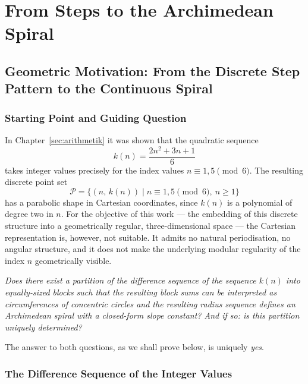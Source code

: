 \chapter{From Steps to the Archimedean Spiral}\label{sec:spirale}

\section{Geometric Motivation: From the Discrete Step Pattern to the
Continuous Spiral}

\subsection{Starting Point and Guiding Question}

In Chapter~\ref{sec:arithmetik} it was shown that the quadratic sequence
\[
  k(n) = \frac{2n^2 + 3n + 1}{6}
\]
takes integer values precisely for the index values $n \equiv 1, 5 \pmod{6}$.
The resulting discrete point set
\[
  \mathcal{P} = \bigl\{(n,\, k(n)) \mid n \equiv 1, 5 \pmod{6},\ n \geq 1\bigr\}
\]
has a parabolic shape in Cartesian coordinates, since $k(n)$ is a polynomial
of degree two in $n$. For the objective of this work --- the embedding of this
discrete structure into a geometrically regular, three-dimensional space --- the
Cartesian representation is, however, not suitable. It admits no natural
periodisation, no angular structure, and it does not make the underlying modular
regularity of the index $n$ geometrically visible.

\begin{tcolorbox}[
  title={Guiding question of this chapter},
  colback=gray!5,
  colframe=gray!50!black,
  enhanced,
  breakable
]
\emph{Does there exist a partition of the difference sequence of the
sequence $k(n)$ into equally-sized blocks such that the resulting block
sums can be interpreted as circumferences of concentric circles and the
resulting radius sequence defines an Archimedean spiral with a closed-form
slope constant? And if so: is this partition uniquely determined?}
\end{tcolorbox}

The answer to both questions, as we shall prove below, is uniquely \emph{yes}.

\subsection{The Difference Sequence of the Integer Values}
\label{subsec:differenzstruktur}

